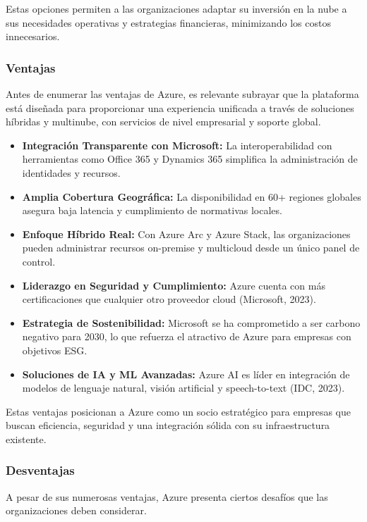 {                Estas opciones permiten a las organizaciones adaptar su inversión en la nube a sus necesidades operativas y estrategias financieras, minimizando los costos innecesarios.
                
            \subsubsection{Ventajas}
                Antes de enumerar las ventajas de Azure, es relevante subrayar que la plataforma está diseñada para proporcionar una experiencia unificada a través de soluciones híbridas y multinube, con servicios de nivel empresarial y soporte global.
                    
                \begin{itemize}
                    \item \textbf{Integración Transparente con Microsoft:} La interoperabilidad con herramientas como Office 365 y Dynamics 365 simplifica la administración de identidades y recursos.
                    \item \textbf{Amplia Cobertura Geográfica:} La disponibilidad en 60+ regiones globales asegura baja latencia y cumplimiento de normativas locales.
                    \item \textbf{Enfoque Híbrido Real:} Con Azure Arc y Azure Stack, las organizaciones pueden administrar recursos on-premise y multicloud desde un único panel de control.
                    \item \textbf{Liderazgo en Seguridad y Cumplimiento:} Azure cuenta con más certificaciones que cualquier otro proveedor cloud (Microsoft, 2023).
                    \item \textbf{Estrategia de Sostenibilidad:} Microsoft se ha comprometido a ser carbono negativo para 2030, lo que refuerza el atractivo de Azure para empresas con objetivos ESG.
                    \item \textbf{Soluciones de IA y ML Avanzadas:} Azure AI es líder en integración de modelos de lenguaje natural, visión artificial y speech-to-text (IDC, 2023).
                \end{itemize}
                    
                Estas ventajas posicionan a Azure como un socio estratégico para empresas que buscan eficiencia, seguridad y una integración sólida con su infraestructura existente.
                    
            \subsubsection{Desventajas}
                A pesar de sus numerosas ventajas, Azure presenta ciertos desafíos que las organizaciones deben considerar.
                    
}
